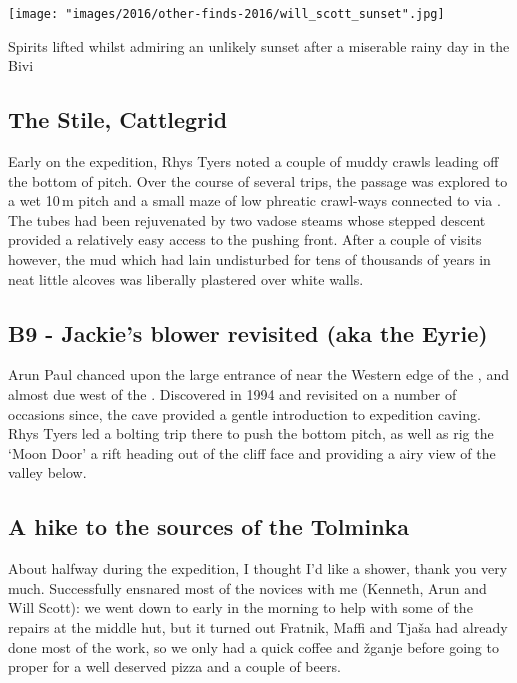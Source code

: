\begin{marginfigure}
\checkoddpage \ifoddpage \forcerectofloat \else \forceversofloat \fi
\centering
 \texttt{[image: "images/2016/other-finds-2016/will\_scott\_sunset".jpg]} 
 \caption{Spirits lifted whilst admiring an unlikely sunset after a miserable rainy day in the Bivi }
 \label{Sunset}
\end{marginfigure}



\subsection{The Stile, Cattlegrid}
Early on the expedition, Rhys Tyers noted a couple of muddy crawls leading off the bottom of  pitch. Over the course of several trips, the  passage was explored to a wet 10\,m pitch and a small maze of low phreatic crawl-ways connected to  via . The tubes had been rejuvenated by two vadose steams whose stepped descent provided a relatively easy access to the pushing front. After a couple of visits however, the mud which had lain undisturbed for tens of thousands of years in neat little alcoves was liberally plastered over white walls.

\subsection{B9 - Jackie's blower revisited (aka the Eyrie)}
Arun Paul chanced upon the large entrance of  near the Western edge of the , and almost due west of the . Discovered in 1994 and revisited on a number of occasions since, the cave provided a gentle introduction to expedition caving. Rhys Tyers led a bolting trip there to push the bottom pitch, as well as rig the `Moon Door' a rift heading out of the cliff face and providing a airy view of the  valley below.

 \subsection{A hike to the sources of the Tolminka}
 About halfway during the expedition, I thought I'd like a shower, thank you very much. Successfully ensnared most of the novices with me (Kenneth, Arun and Will Scott): we went down to  early in the morning to help with some of the repairs at the middle hut, but it turned out Fratnik, Maffi and Tja\v{s}a had already done most of the work, so we only had a quick coffee and \v{z}ganje before going to  proper for a well deserved pizza and a couple of beers. 
 
